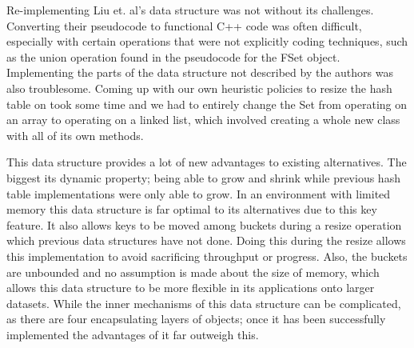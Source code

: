 \documentclass[11pt]{article} %
\begin{document}
Re-implementing Liu et. al's data structure was not without its challenges. Converting their pseudocode to functional C++ code was often difficult, especially with certain operations that were not explicitly coding techniques, such as the union operation found in the pseudocode for the FSet object. Implementing the parts of the data structure not described by the authors was also troublesome. Coming up with our own heuristic policies to resize the hash table on took some time and we had to entirely change the Set from operating on an array to operating on a linked list, which involved creating a whole new class with all of its own methods. 

This data structure provides a lot of new advantages to existing alternatives. The biggest its dynamic property; being able to grow and shrink while previous hash table implementations were only able to grow. In an environment with limited memory this data structure is far optimal to its alternatives due to this key feature. It also allows keys to be moved among buckets during a resize operation which previous data structures have not done. Doing this during the resize allows this implementation to avoid sacrificing throughput or progress. Also, the buckets are unbounded and no assumption is made about the size of memory, which allows this data structure to be more flexible in its applications onto larger datasets. While the inner mechanisms of this data structure can be complicated, as there are four encapsulating layers of objects; once it has been successfully implemented the advantages of it far outweigh this.



\nocite{*}


\end{document}
